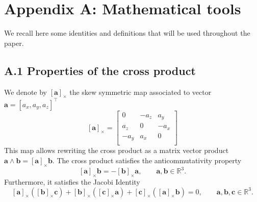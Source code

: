 \documentclass{svjour3}                     %
\newcommand{\crmat}[1]{\ensuremath{[#1]_{\times}}}
\begin{document}

\section*{Appendix A: Mathematical tools}
We recall here some identities and definitions that will be used throughout the paper. 
\subsection*{\normalsize \textbf{A.1 Properties of the cross product}}
We denote by $\crmat{\bm{a}}$ the skew symmetric map associated to vector $\bm{a} = [a_x, a_y, a_z]^\top$
\begin{equation}
\crmat{\bm{a}} = 
\begin{bmatrix}
0 & -a_z & a_y \\
a_z & 0 & -a_x \\
-a_y & a_x & 0 \\
\end{bmatrix}
\end{equation}
This map allows rewriting the cross product as a matrix vector product $\bm{a}\wedge \bm{b} = \crmat{\bm{a}}\bm{b}$. The cross product satisfies the anticommutativity property
\begin{equation}
\label{eq:anticom}
\crmat{\bm{a}} \bm{b} = - \crmat{\bm{b}} \bm{a}, \qquad \bm{a}, \bm{b} \in \mathbb{R}^3.
\end{equation}
Furthermore, it satisfies the Jacobi Identity
\begin{equation}
\label{eq:jacobi}
\crmat{\bm{a}} (\crmat{\bm{b}} \bm{c}) + \crmat{\bm{b}} (\crmat{\bm{c}} \bm{a}) + \crmat{\bm{c}} (\crmat{\bm{a}} \bm{b}) = 0, \qquad \bm{a}, \bm{b}, \bm{c} \in \mathbb{R}^3.
\end{equation}
\end{document}
